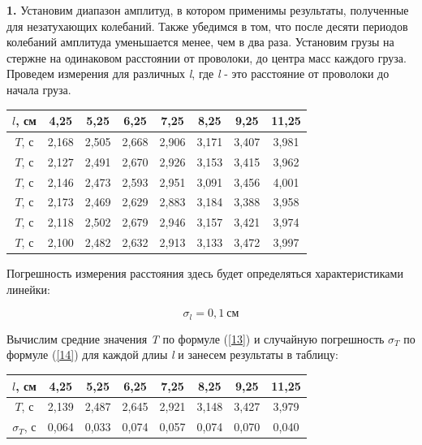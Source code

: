\documentclass[12pt,a4paper]{article}
\begin{document}
\vspace{0,5cm}

\textbf{1.} Установим диапазон амплитуд, в котором применимы результаты, полученные для незатухающих колебаний. Также убедимся в том, что после десяти периодов колебаний амплитуда уменьшается менее, чем в два раза. Установим грузы на стержне на одинаковом расстоянии от проволоки, до центра масс каждого груза. Проведем измерения для различных \textit{l}, где \textit{l} - это расстояние от проволоки до начала груза. 

\vspace{0,5cm}

\begin{tabular}{|c|c|c|c|c|c|c|c|}
\hline
$l$, см & 4,25 & 5,25 & 6,25 & 7,25 & 8,25 & 9,25 & 11,25 \\
\hline
$T$, с & 2,168 & 2,505 & 2,668 & 2,906 & 3,171 & 3,407 & 3,981 \\
\hline
$T$, с & 2,127 & 2,491 & 2,670 & 2,926 & 3,153 & 3,415 & 3,962 \\
\hline
$T$, с & 2,146 & 2,473 & 2,593 & 2,951 & 3,091 & 3,456 & 4,001 \\
\hline
$T$, с & 2,173 & 2,469 & 2,629 & 2,883 & 3,184 & 3,388 & 3,958 \\
\hline
$T$, с & 2,118 & 2,502 & 2,679 & 2,946 & 3,157 & 3,421 & 3,974 \\
\hline
$T$, с & 2,100 & 2,482 & 2,632 & 2,913 & 3,133 & 3,472 & 3,997 \\
\hline
\end{tabular}

\vspace{0,5cm}

Погрешность измерения расстояния здесь будет определяться характеристиками линейки:

\[\sigma_l = 0,1\:\text{см}\]

Вычислим средние значения \textit{T} по формуле (\ref{13}) и случайную погрешность $\sigma_T$ по формуле (\ref{14}) для каждой длиы \textit{l} и занесем результаты в таблицу:

\vspace{0,5cm}

\begin{tabular}{|c|c|c|c|c|c|c|c|}
\hline
$l$, см & 4,25 & 5,25 & 6,25 & 7,25 & 8,25 & 9,25 & 11,25 \\
\hline
$T$, с & 2,139 & 2,487 & 2,645 & 2,921 & 3,148 & 3,427 & 3,979 \\
\hline
$\sigma_T$, с & 0,064 & 0,033 & 0,074 & 0,057 & 0,074 & 0,070 & 0,040 \\
\hline
\end{tabular}
\end{document}
